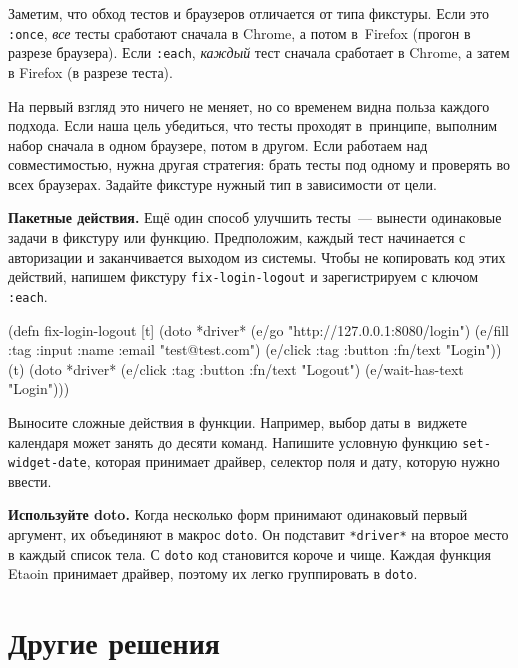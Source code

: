 
Заметим, что обход тестов и браузеров отличается от типа фикстуры. Если это
\verb|:once|, \emph{все} тесты сработают сначала в Chrome, а потом в~Firefox
(прогон в разрезе браузера). Если \verb|:each|, \emph{каждый} тест сначала
сработает в Chrome, а затем в Firefox (в разрезе теста).

На первый взгляд это ничего не меняет, но со временем видна польза каждого
подхода. Если наша цель убедиться, что тесты проходят в~принципе, выполним набор
сначала в одном браузере, потом в другом. Если работаем над совместимостью,
нужна другая стратегия: брать тесты под одному и проверять во всех
браузерах. Задайте фикстуре нужный тип в зависимости от цели.

\textbf{Пакетные действия.} Ещё один способ улучшить тесты~--- вынести
одинаковые задачи в фикстуру или функцию. Предположим, каждый тест начинается с
авторизации и заканчивается выходом из системы. Чтобы не копировать код этих
действий, напишем фикстуру \verb|fix-login-logout| и зарегистрируем с ключом
\verb|:each|.

\begin{english}
  \begin{clojure}
(defn fix-login-logout [t]
  (doto *driver*
    (e/go "http://127.0.0.1:8080/login")
    (e/fill {:tag :input :name :email} "test@test.com")
    (e/click {:tag :button :fn/text "Login"}))
  (t)
  (doto *driver*
    (e/click {:tag :button :fn/text "Logout"})
    (e/wait-has-text "Login")))
  \end{clojure}
\end{english}

Выносите сложные действия в функции. Например, выбор даты в~виджете календаря
может занять до десяти команд. Напишите условную функцию
\verb|set-widget-date|, которая принимает драйвер, селектор поля и дату,
которую нужно ввести.


\textbf{Используйте doto.} Когда несколько форм принимают одинаковый первый
аргумент, их объединяют в макрос \verb|doto|. Он подставит \verb|*driver*| на
второе место в каждый список тела. С \verb|doto| код становится короче и
чище. Каждая функция Etaoin принимает драйвер, поэтому их легко группировать в
\verb|doto|.

\section{Другие решения}

